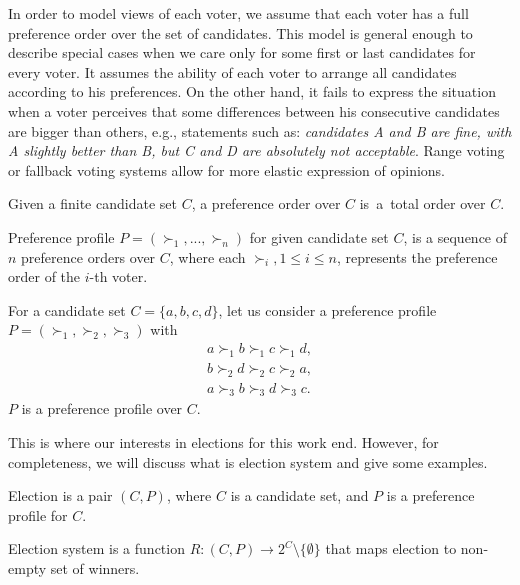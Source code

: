 In order to model views of each voter,
we assume that each voter has a full preference order over the set of candidates.
This model is general enough to describe special cases
when we care only for some first or last candidates for every voter.
It assumes the ability of each voter to arrange all candidates according to his preferences.
On the other hand, it fails to express the situation when a voter perceives that some differences
between his consecutive candidates are bigger than others, e.g., statements such as:
\textit{candidates A and B are fine, with A slightly better than B, but C and D are absolutely not acceptable}.
Range voting \cite{rangevoting} or fallback voting \cite{fallbackvoting} systems
allow for more elastic expression of opinions.

\begin{defn}
Given a finite candidate set $C$, a preference order over $C$
is~a~total order over $C$.
\end{defn}

\begin{defn}
Preference profile $P = (\succ_1, ... , \succ_n)$ for given candidate set $C$,
is a sequence of $n$ preference orders over $C$,
where each $\succ_i, 1 \leq i \leq n$, represents the preference order of the $i$-th voter.
\end{defn}

\begin{exmp}
For a candidate set $C = \{a, b, c, d\}$,
let us consider a preference profile $P = (\succ_1, \succ_2, \succ_3)$ with
\begin{align*}
a \succ_1 b \succ_1 c \succ_1 d, \\
b \succ_2 d \succ_2 c \succ_2 a,	\\
a \succ_3 b \succ_3 d \succ_3 c.
\end{align*}
$P$ is a preference profile over $C$.
\end{exmp}

This is where our interests in elections for this work end.
However, for completeness, we will discuss what is election system and give some examples.

\begin{defn}[election]
Election is a pair $(C, P)$, where $C$ is a candidate set, and $P$ is a preference profile for $C$.
\end{defn}

\begin{defn}
Election system is a function $R : (C,P) \rightarrow 2^{C} \setminus \{\emptyset\}$
that maps election to non-empty set of winners.
\end{defn}

